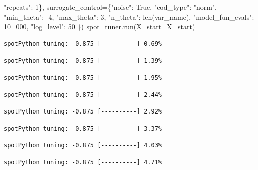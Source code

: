 \documentclass[
  letterpaper,
  DIV=11,
  numbers=noendperiod]{scrreprt}
\newenvironment{Shaded}{\begin{snugshade}}{\end{snugshade}}
\newcommand{\BuiltInTok}[1]{\textcolor[rgb]{0.00,0.23,0.31}{#1}}
\newcommand{\DecValTok}[1]{\textcolor[rgb]{0.68,0.00,0.00}{#1}}
\newcommand{\NormalTok}[1]{\textcolor[rgb]{0.00,0.23,0.31}{#1}}
\newcommand{\OperatorTok}[1]{\textcolor[rgb]{0.37,0.37,0.37}{#1}}
\newcommand{\StringTok}[1]{\textcolor[rgb]{0.13,0.47,0.30}{#1}}
\newcommand{\VariableTok}[1]{\textcolor[rgb]{0.07,0.07,0.07}{#1}}
\begin{document}
\begin{Shaded}
\begin{Highlighting}[]
                                   \StringTok{"repeats"}\NormalTok{: }\DecValTok{1}\NormalTok{\},}
\NormalTok{                   surrogate\_control}\OperatorTok{=}\NormalTok{\{}\StringTok{"noise"}\NormalTok{: }\VariableTok{True}\NormalTok{,}
                                      \StringTok{"cod\_type"}\NormalTok{: }\StringTok{"norm"}\NormalTok{,}
                                      \StringTok{"min\_theta"}\NormalTok{: }\OperatorTok{{-}}\DecValTok{4}\NormalTok{,}
                                      \StringTok{"max\_theta"}\NormalTok{: }\DecValTok{3}\NormalTok{,}
                                      \StringTok{"n\_theta"}\NormalTok{: }\BuiltInTok{len}\NormalTok{(var\_name),}
                                      \StringTok{"model\_fun\_evals"}\NormalTok{: }\DecValTok{10\_000}\NormalTok{,}
                                      \StringTok{"log\_level"}\NormalTok{: }\DecValTok{50}
\NormalTok{                                      \})}
\NormalTok{spot\_tuner.run(X\_start}\OperatorTok{=}\NormalTok{X\_start)}
\end{Highlighting}
\end{Shaded}

\begin{verbatim}
spotPython tuning: -0.875 [----------] 0.69% 
\end{verbatim}

\begin{verbatim}
spotPython tuning: -0.875 [----------] 1.39% 
\end{verbatim}

\begin{verbatim}
spotPython tuning: -0.875 [----------] 1.95% 
\end{verbatim}

\begin{verbatim}
spotPython tuning: -0.875 [----------] 2.44% 
\end{verbatim}

\begin{verbatim}
spotPython tuning: -0.875 [----------] 2.92% 
\end{verbatim}

\begin{verbatim}
spotPython tuning: -0.875 [----------] 3.37% 
\end{verbatim}

\begin{verbatim}
spotPython tuning: -0.875 [----------] 4.03% 
\end{verbatim}

\begin{verbatim}
spotPython tuning: -0.875 [----------] 4.71% 
\end{verbatim}
\end{document}
